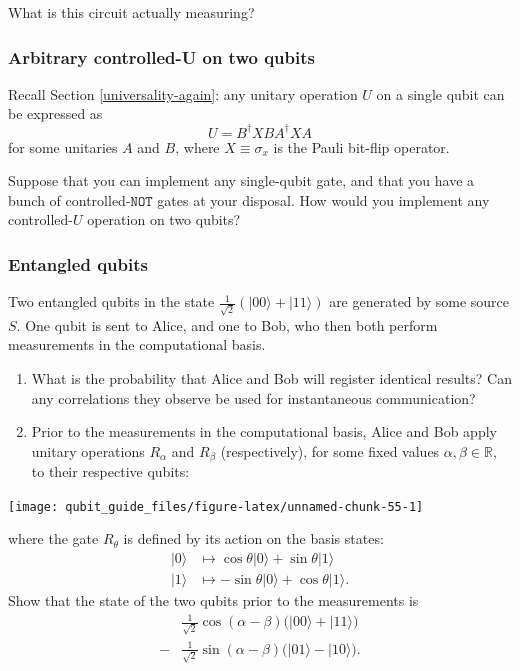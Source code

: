 \documentclass[fleqn,a4paper]{article}
\theoremstyle{definition}
\theoremstyle{definition}
\theoremstyle{definition}
\theoremstyle{definition}
\theoremstyle{remark}
\begin{document}
What is this circuit actually measuring?

\hypertarget{arbitrary-controlled-u-on-two-qubits}{%
\subsubsection{Arbitrary controlled-U on two qubits}\label{arbitrary-controlled-u-on-two-qubits}}

Recall Section \ref{universality-again}: any unitary operation \(U\) on a single qubit can be expressed as
\[
  U = B^\dagger XBA^\dagger XA
\]
for some unitaries \(A\) and \(B\), where \(X\equiv\sigma_x\) is the Pauli bit-flip operator.

Suppose that you can implement any single-qubit gate, and that you have a bunch of controlled-\(\texttt{NOT}\) gates at your disposal.
How would you implement any controlled-\(U\) operation on two qubits?

\hypertarget{entangled-qubits}{%
\subsubsection{Entangled qubits}\label{entangled-qubits}}

Two entangled qubits in the state \(\frac{1}{\sqrt{2}}(|00\rangle+|11\rangle)\) are generated by some source \(S\).
One qubit is sent to Alice, and one to Bob, who then both perform measurements in the computational basis.

\begin{enumerate}
\def\labelenumi{\arabic{enumi}.}
\item
  What is the probability that Alice and Bob will register identical results?
  Can any correlations they observe be used for instantaneous communication?
\item
  Prior to the measurements in the computational basis, Alice and Bob apply unitary operations \(R_\alpha\) and \(R_\beta\) (respectively), for some fixed values \(\alpha,\beta\in\mathbb{R}\), to their respective qubits:
\end{enumerate}

\begin{center}\texttt{[image: qubit\_guide\_files/figure-latex/unnamed-chunk-55-1]} \end{center}

where the gate \(R_\theta\) is defined by its action on the basis states:
\[
    \begin{aligned}
      |0\rangle
      &\longmapsto
      \cos\theta|0\rangle + \sin\theta|1\rangle
    \\|1\rangle
      &\longmapsto
      -\sin\theta|0\rangle + \cos\theta|1\rangle.
    \end{aligned}
  \]
Show that the state of the two qubits prior to the measurements is
\[
    \begin{aligned}
      &\frac{1}{\sqrt{2}}\cos(\alpha-\beta)\big( |00\rangle + |11\rangle \big)
    \\- &\frac{1}{\sqrt{2}}\sin(\alpha-\beta)\big( |01\rangle - |10\rangle \big).
    \end{aligned}
  \]
\end{document}
